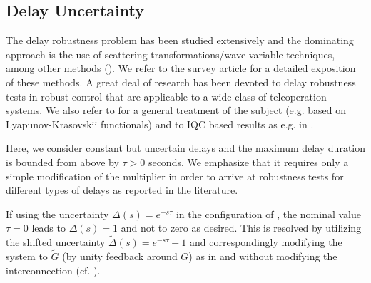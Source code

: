 \subsection{Delay Uncertainty}\label{sec:delayiqc}

The delay robustness problem has been studied extensively and the dominating approach 
is the use of scattering transformations/wave variable techniques, among other methods 
(\cite{leungfa, eusebi, andersonspong, nieslotine, nieslotine2, hokayemspong, yokokohji, 
lozano, arcara, parkcho, aziminejad, leespong}). We refer to the survey article \cite{hokayemspong} 
for a detailed exposition of these methods. A great deal of research has been devoted to 
delay robustness tests in robust control that are applicable to a wide class of teleoperation 
systems. We also refer to \cite{richard} for a general treatment of the subject (e.g. based on 
Lyapunov-Krasovskii functionals) and to IQC based results as e.g. in \cite{scorletti,junsafonov,
kaorantzer,niculescu}.

Here, we consider constant but uncertain delays and the maximum delay duration is bounded 
from above by $\bar{\tau} > 0$ seconds. We emphasize that it requires only a simple 
modification of the multiplier in order to arrive at robustness tests for different types 
of delays as reported in the literature.


If using the uncertainty $\Delta(s)=e^{-s\tau}$ in the configuration of , 
the nominal value $\tau=0$ leads to $\Delta(s)=1$ and not to zero as desired. This is resolved 
by utilizing the shifted uncertainty $\tilde{\Delta}(s)=e^{-s\tau}-1$ and correspondingly 
modifying the system to $\tilde{G}$ (by unity feedback around $G$) as in 
 and without modifying the interconnection (cf. \cite{leungfa}).

